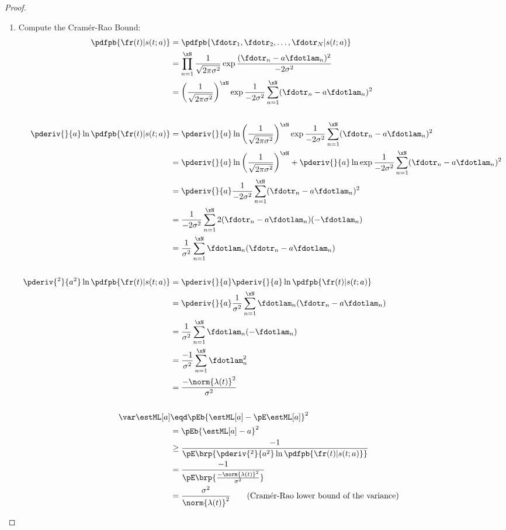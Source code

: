 \begin{proof}
\begin{enumerate}
\item Compute the Cram\'er-Rao Bound:
\begin{align*}
   \pdfpb{\fr(t)|s(t; a)}
     &=  \pdfpb{\fdotr_1, \fdotr_2,\ldots,\fdotr_N|s(t; a)}
   \\&=  \prod_{n=1}^\xN \frac{1}{\sqrt{2\pi\sigma^2}}
          \exp{\frac{(\fdotr_n- a\fdotlam_n)^2}{-2\sigma^2}}
   \\&=  \left(\frac{1}{\sqrt{2\pi\sigma^2}}\right)^\xN
          \exp{\frac{1}{-2\sigma^2} \sum_{n=1}^\xN (\fdotr_n- a\fdotlam_n)^2}
\\
\\
   \pderiv{}{a}\ln\pdfpb{\fr(t)|s(t; a)}
     &=  \pderiv{}{a}\ln
          \left(\frac{1}{\sqrt{2\pi\sigma^2}}\right)^\xN
          \exp{\frac{1}{-2\sigma^2} \sum_{n=1}^\xN (\fdotr_n- a\fdotlam_n)^2}
   \\&=  \pderiv{}{a}\ln
          \left(\frac{1}{\sqrt{2\pi\sigma^2}}\right)^\xN
       +  \pderiv{}{a}\ln
          \exp{\frac{1}{-2\sigma^2} \sum_{n=1}^\xN (\fdotr_n- a\fdotlam_n)^2}
   \\&=  \pderiv{}{a}
          \frac{1}{-2\sigma^2} \sum_{n=1}^\xN (\fdotr_n- a\fdotlam_n)^2
   \\&=  \frac{1}{-2\sigma^2} \sum_{n=1}^\xN 2(\fdotr_n- a\fdotlam_n)(- \fdotlam_n)
   \\&=  \frac{1}{\sigma^2} \sum_{n=1}^\xN \fdotlam_n(\fdotr_n- a\fdotlam_n)
\\
\\
   \pderiv{^2}{a^2}\ln\pdfpb{\fr(t)|s(t; a)}
     &=  \pderiv{}{a}\pderiv{}{a}\ln\pdfpb{\fr(t)|s(t; a)}
   \\&=  \pderiv{}{a}
          \frac{1}{\sigma^2} \sum_{n=1}^\xN \fdotlam_n(\fdotr_n- a\fdotlam_n)
   \\&=  \frac{1}{\sigma^2} \sum_{n=1}^\xN \fdotlam_n(-\fdotlam_n)
   \\&=  \frac{-1}{\sigma^2} \sum_{n=1}^\xN \fdotlam_n^2
   \\&=  \frac{-\norm{\lambda(t)}^2}{\sigma^2}
\\
\\
   \var\estML[a]
     &\eqd \pEb{\estML[a]-\pE\estML[a]}^2
   \\&=    \pEb{\estML[a]- a}^2
   \\&\ge  \frac{-1}{\pE\brp{\pderiv{^2}{ a^2} \ln \pdfpb{\fr(t)|s(t; a)}}}
   \\&=    \frac{-1}{\pE\brp{\frac{-\norm{\lambda(t)}^2}{\sigma^2}}}
   \\&=    \frac{\sigma^2}{\norm{\lambda(t)}^2}
     \qquad\text{(Cram\'er-Rao lower bound of the variance)}
\end{align*}


\end{enumerate}
\end{proof}
